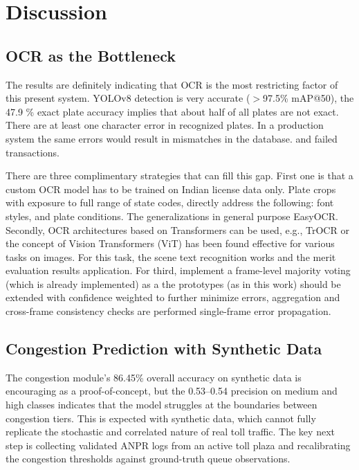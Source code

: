 \documentclass[conference]{IEEEtran}
\begin{document}
\section{Discussion}

\subsection{OCR as the Bottleneck}

The results are definitely indicating that OCR is the most restricting factor of this present system.
YOLOv8 detection is very accurate ($>$97.5\% mAP@50),
the 47.9 \% exact plate accuracy implies that about half of all plates are not exact. There are at least one character error in recognized plates.
In a production system the same errors would result in mismatches in the database.
and failed transactions.

There are three complimentary strategies that can fill this gap.
First one is that a custom OCR model has to be trained on Indian license data only. Plate crops with exposure to full range of state codes,
directly address the following: font styles, and plate conditions.
The generalizations in general purpose EasyOCR.
Secondly, OCR architectures based on Transformers can be used, e.g., TrOCR or
the concept of Vision Transformers (ViT) has been found effective for various tasks on images.
For this task, the scene text recognition works and the merit evaluation results application.
For third, implement a frame-level majority voting (which is already implemented) as a the prototypes (as in this work) should be extended with confidence weighted
to further minimize errors, aggregation and cross-frame consistency checks are performed 
single-frame error propagation.
\subsection{Congestion Prediction with Synthetic Data}

The congestion module's 86.45\% overall accuracy on synthetic data
is encouraging as a proof-of-concept, but the 0.53--0.54 precision
on medium and high classes indicates that the model struggles at
the boundaries between congestion tiers.
This is expected with synthetic data, which cannot fully replicate
the stochastic and correlated nature of real toll traffic.
The key next step is collecting validated ANPR logs from an active
toll plaza and recalibrating the congestion thresholds against
ground-truth queue observations.
\end{document}
